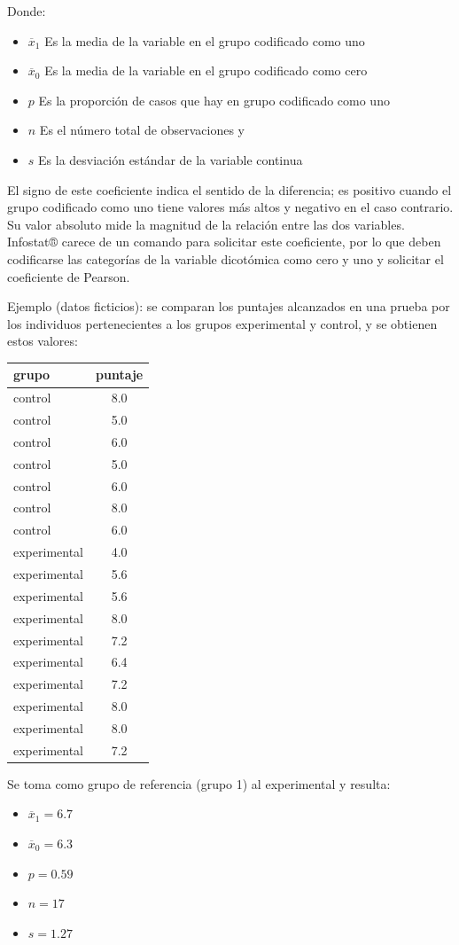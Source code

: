\documentclass[]{book}
\begin{document}
Donde:

\begin{itemize}
\item
  \({\overline{x}}_{1}\) Es la media de la variable en el grupo codificado como uno
\item
  \({\overline{x}}_{0}\) Es la media de la variable en el grupo codificado como cero
\item
  \(p\) Es la proporción de casos que hay en grupo codificado como uno
\item
  \(n\) Es el número total de observaciones y
\item
  \(s\) Es la desviación estándar de la variable continua
\end{itemize}

El signo de este coeficiente indica el sentido de la diferencia; es positivo cuando el grupo codificado como uno tiene valores más altos y negativo en el caso contrario. Su valor absoluto mide la magnitud de la relación entre las dos variables. Infostat® carece de un comando para solicitar este coeficiente, por lo que deben codificarse las categorías de la variable dicotómica como cero y uno y solicitar el coeficiente de Pearson.

Ejemplo (datos ficticios): se comparan los puntajes alcanzados en una prueba por los individuos pertenecientes a los grupos experimental y
control, y se obtienen estos valores:

\begin{longtable}[]{@{}lc@{}}
\toprule
grupo & puntaje\tabularnewline
\midrule
\endhead
control & 8.0\tabularnewline
control & 5.0\tabularnewline
control & 6.0\tabularnewline
control & 5.0\tabularnewline
control & 6.0\tabularnewline
control & 8.0\tabularnewline
control & 6.0\tabularnewline
experimental & 4.0\tabularnewline
experimental & 5.6\tabularnewline
experimental & 5.6\tabularnewline
experimental & 8.0\tabularnewline
experimental & 7.2\tabularnewline
experimental & 6.4\tabularnewline
experimental & 7.2\tabularnewline
experimental & 8.0\tabularnewline
experimental & 8.0\tabularnewline
experimental & 7.2\tabularnewline
\bottomrule
\end{longtable}

Se toma como grupo de referencia (grupo 1) al experimental y resulta:

\begin{itemize}
\item
  \({\overline{x}}_{1} = 6.7\)
\item
  \({\overline{x}}_{0} = 6.3\)
\item
  \(p = 0.59\)
\item
  \(n = 17\)
\item
  \(s = 1.27\)
\end{itemize}
\end{document}
